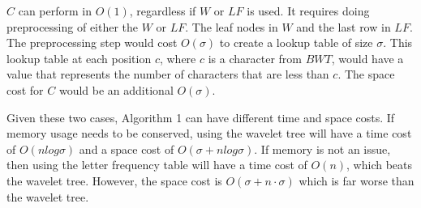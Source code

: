 \documentclass[11pt]{article}
\begin{document}
\newpage

$C$ can perform in $O(1)$, regardless if $W$ or $LF$ is used. It requires doing preprocessing of either the $W$ or $LF$. The leaf nodes in $W$ and the last row in $LF$. The preprocessing step would cost $O(\sigma)$ to create a lookup table of size $\sigma$. This lookup table at each position $c$, where $c$ is a character from $BWT$, would have a value that represents the number of characters that are less than $c$. The space cost for $C$ would be an additional $O(\sigma)$.

Given these two cases, Algorithm 1 can have different time and space costs. If memory usage needs to be conserved, using the wavelet tree will have a time cost of $O(nlog\sigma)$ and a space cost of $O(\sigma + nlog\sigma)$. If memory is not an issue, then using the letter frequency table will have a time cost of $O(n)$, which beats the wavelet tree. However, the space cost is $O(\sigma + n \cdot \sigma)$ which is far worse than the wavelet tree.
\end{document}
